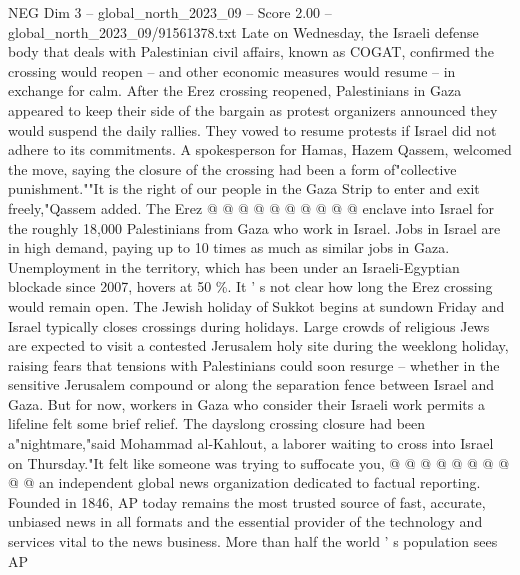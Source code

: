 \begin{textsample}{NEG Dim 3 – global\_north\_2023\_09 – Score 2.00 – global\_north\_2023\_09/91561378.txt}
Late on Wednesday, the Israeli defense body that deals with Palestinian civil affairs, known as COGAT, confirmed the crossing would reopen -- and other economic measures would resume -- in exchange for calm.
After the Erez crossing reopened, Palestinians in Gaza appeared to keep their side of the bargain as protest organizers announced they would suspend the daily rallies.
They vowed to resume protests if Israel did not adhere to its commitments.
A spokesperson for Hamas, Hazem Qassem, welcomed the move, saying the closure of the crossing had been a form of"collective punishment.""It is the right of our people in the Gaza Strip to enter and exit freely,"Qassem added.
The Erez @ @ @ @ @ @ @ @ @ @ enclave into Israel for the roughly 18,000 Palestinians from Gaza who work in Israel.
Jobs in Israel are in high demand, paying up to 10 times as much as similar jobs in Gaza.
Unemployment in the territory, which has been under an Israeli-Egyptian blockade since 2007, hovers at 50 \%.
It ' s not clear how long the Erez crossing would remain open.
The Jewish holiday of Sukkot begins at sundown Friday and Israel typically closes crossings during holidays.
Large crowds of religious Jews are expected to visit a contested Jerusalem holy site during the weeklong holiday, raising fears that tensions with Palestinians could soon resurge -- whether in the sensitive Jerusalem compound or along the separation fence between Israel and Gaza.
But for now, workers in Gaza who consider their Israeli work permits a lifeline felt some brief relief.
The dayslong crossing closure had been a"nightmare,"said Mohammad al-Kahlout, a laborer waiting to cross into Israel on Thursday."It felt like someone was trying to suffocate you, @ @ @ @ @ @ @ @ @ @ an independent global news organization dedicated to factual reporting.
Founded in 1846, AP today remains the most trusted source of fast, accurate, unbiased news in all formats and the essential provider of the technology and services vital to the news business.
More than half the world ' s population sees AP

\end{textsample}
